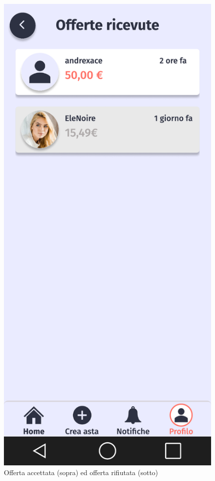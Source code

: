     \begin{figure}[!htb]
        \begin{minipage}{0.32\textwidth}
            \centering
            \includegraphics[width=.7\linewidth]{Immagini/Frames/Venditore/V14.pdf}
            \caption{Offerta accettata (sopra) ed offerta rifiutata (sotto)}
        \end{minipage}\hfill
        \begin{minipage}{0.32\textwidth}
            \centering

\end{minipage}
\end{figure}
